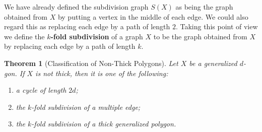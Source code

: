 \documentclass[12pt,a4paper,openany]{book}
\newtheorem{theorem}{Theorem}[section]
\begin{document}
We have already defined the subdivision graph $S(X)$ as being the graph obtained from $X$ by putting a vertex in the middle of each edge. We could also regard this as replacing each edge by a path of length $2$. Taking this point of view we define the \textbf{$k$-fold subdivision} of a graph $X$ to be the graph obtained from $X$ by replacing each edge by a path of length $k$.

\begin{theorem}[Classification of Non-Thick Polygons]\label{thm:non-thick-classification}
Let $X$ be a generalized $d$-gon. If $X$ is not thick, then it is one of the following:
\begin{enumerate}
    \item a cycle of length $2d$;\vspace{2pt}
    \item the $k$-fold subdivision of a multiple edge;\vspace{2pt}
    \item the $k$-fold subdivision of a thick generalized polygon.
\end{enumerate}
\end{theorem}
\end{document}
